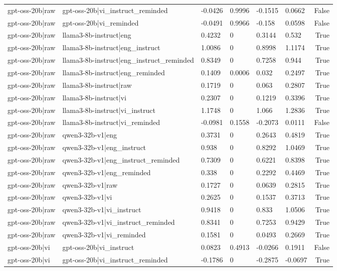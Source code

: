 \begin{table}
\begin{tabular}{llllllr}
gpt-oss-20b|raw & gpt-oss-20b|vi_instruct_reminded & -0.0426 & 0.9996 & -0.1515 & 0.0662 & False \\
gpt-oss-20b|raw & gpt-oss-20b|vi_reminded & -0.0491 & 0.9966 & -0.158 & 0.0598 & False \\
gpt-oss-20b|raw & llama3-8b-instruct|eng & 0.4232 & 0 & 0.3144 & 0.532 & True \\
gpt-oss-20b|raw & llama3-8b-instruct|eng_instruct & 1.0086 & 0 & 0.8998 & 1.1174 & True \\
gpt-oss-20b|raw & llama3-8b-instruct|eng_instruct_reminded & 0.8349 & 0 & 0.7258 & 0.944 & True \\
gpt-oss-20b|raw & llama3-8b-instruct|eng_reminded & 0.1409 & 0.0006 & 0.032 & 0.2497 & True \\
gpt-oss-20b|raw & llama3-8b-instruct|raw & 0.1719 & 0 & 0.063 & 0.2807 & True \\
gpt-oss-20b|raw & llama3-8b-instruct|vi & 0.2307 & 0 & 0.1219 & 0.3396 & True \\
gpt-oss-20b|raw & llama3-8b-instruct|vi_instruct & 1.1748 & 0 & 1.066 & 1.2836 & True \\
gpt-oss-20b|raw & llama3-8b-instruct|vi_reminded & -0.0981 & 0.1558 & -0.2073 & 0.0111 & False \\
gpt-oss-20b|raw & qwen3-32b-v1|eng & 0.3731 & 0 & 0.2643 & 0.4819 & True \\
gpt-oss-20b|raw & qwen3-32b-v1|eng_instruct & 0.938 & 0 & 0.8292 & 1.0469 & True \\
gpt-oss-20b|raw & qwen3-32b-v1|eng_instruct_reminded & 0.7309 & 0 & 0.6221 & 0.8398 & True \\
gpt-oss-20b|raw & qwen3-32b-v1|eng_reminded & 0.338 & 0 & 0.2292 & 0.4469 & True \\
gpt-oss-20b|raw & qwen3-32b-v1|raw & 0.1727 & 0 & 0.0639 & 0.2815 & True \\
gpt-oss-20b|raw & qwen3-32b-v1|vi & 0.2625 & 0 & 0.1537 & 0.3713 & True \\
gpt-oss-20b|raw & qwen3-32b-v1|vi_instruct & 0.9418 & 0 & 0.833 & 1.0506 & True \\
gpt-oss-20b|raw & qwen3-32b-v1|vi_instruct_reminded & 0.8341 & 0 & 0.7253 & 0.9429 & True \\
gpt-oss-20b|raw & qwen3-32b-v1|vi_reminded & 0.1581 & 0 & 0.0493 & 0.2669 & True \\
gpt-oss-20b|vi & gpt-oss-20b|vi_instruct & 0.0823 & 0.4913 & -0.0266 & 0.1911 & False \\
gpt-oss-20b|vi & gpt-oss-20b|vi_instruct_reminded & -0.1786 & 0 & -0.2875 & -0.0697 & True \\

\end{tabular}
\end{table}
